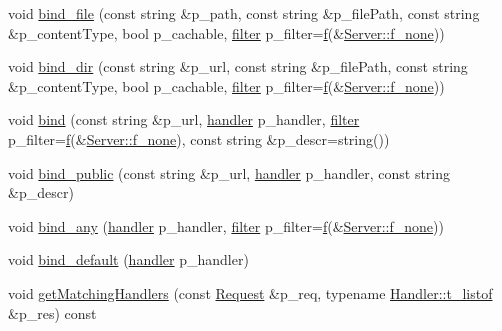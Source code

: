 \begin{DoxyCompactItemize}
\item 
void \hyperlink{classxtd_1_1network_1_1http_1_1Server_ad3788397b3bd576b156823267d377dcc}{bind\+\_\+file} (const string \&p\+\_\+path, const string \&p\+\_\+file\+Path, const string \&p\+\_\+content\+Type, bool p\+\_\+cachable, \hyperlink{structxtd_1_1network_1_1http_1_1Server_1_1Handler_1_1filter}{filter} p\+\_\+filter=\hyperlink{classxtd_1_1network_1_1http_1_1Server_a94d4867ec740265b62b7505584387240}{f}(\&\hyperlink{classxtd_1_1network_1_1http_1_1Server_a862d3098ef04ad7c503ab4e6d04a93cf}{Server\+::f\+\_\+none}))
\item 
void \hyperlink{classxtd_1_1network_1_1http_1_1Server_a58cb8102e486dd24780b876561ae6c11}{bind\+\_\+dir} (const string \&p\+\_\+url, const string \&p\+\_\+file\+Path, const string \&p\+\_\+content\+Type, bool p\+\_\+cachable, \hyperlink{structxtd_1_1network_1_1http_1_1Server_1_1Handler_1_1filter}{filter} p\+\_\+filter=\hyperlink{classxtd_1_1network_1_1http_1_1Server_a94d4867ec740265b62b7505584387240}{f}(\&\hyperlink{classxtd_1_1network_1_1http_1_1Server_a862d3098ef04ad7c503ab4e6d04a93cf}{Server\+::f\+\_\+none}))
\item 
void \hyperlink{classxtd_1_1network_1_1http_1_1Server_aa964ab0b0c3ba29238cb2aae49181537}{bind} (const string \&p\+\_\+url, \hyperlink{structxtd_1_1network_1_1http_1_1Server_1_1Handler_1_1handler}{handler} p\+\_\+handler, \hyperlink{structxtd_1_1network_1_1http_1_1Server_1_1Handler_1_1filter}{filter} p\+\_\+filter=\hyperlink{classxtd_1_1network_1_1http_1_1Server_a94d4867ec740265b62b7505584387240}{f}(\&\hyperlink{classxtd_1_1network_1_1http_1_1Server_a862d3098ef04ad7c503ab4e6d04a93cf}{Server\+::f\+\_\+none}), const string \&p\+\_\+descr=string())
\item 
void \hyperlink{classxtd_1_1network_1_1http_1_1Server_ac6876f1c054c6ebbe802381692fe05e2}{bind\+\_\+public} (const string \&p\+\_\+url, \hyperlink{structxtd_1_1network_1_1http_1_1Server_1_1Handler_1_1handler}{handler} p\+\_\+handler, const string \&p\+\_\+descr)
\item 
void \hyperlink{classxtd_1_1network_1_1http_1_1Server_a6e448be2d0ca71f808bec243cefc4000}{bind\+\_\+any} (\hyperlink{structxtd_1_1network_1_1http_1_1Server_1_1Handler_1_1handler}{handler} p\+\_\+handler, \hyperlink{structxtd_1_1network_1_1http_1_1Server_1_1Handler_1_1filter}{filter} p\+\_\+filter=\hyperlink{classxtd_1_1network_1_1http_1_1Server_a94d4867ec740265b62b7505584387240}{f}(\&\hyperlink{classxtd_1_1network_1_1http_1_1Server_a862d3098ef04ad7c503ab4e6d04a93cf}{Server\+::f\+\_\+none}))
\item 
void \hyperlink{classxtd_1_1network_1_1http_1_1Server_ab132be70e91c14a18638f93d28078b7b}{bind\+\_\+default} (\hyperlink{structxtd_1_1network_1_1http_1_1Server_1_1Handler_1_1handler}{handler} p\+\_\+handler)
\item 
void \hyperlink{classxtd_1_1network_1_1http_1_1Server_a302af1d5323a8c300f0de7acc27ffade}{get\+Matching\+Handlers} (const \hyperlink{classxtd_1_1network_1_1http_1_1Request}{Request} \&p\+\_\+req, typename \hyperlink{classxtd_1_1network_1_1http_1_1Server_1_1Handler_a840883d08fcdd990dbe33b660ee6febb}{Handler\+::t\+\_\+listof} \&p\+\_\+res) const 
\end{DoxyCompactItemize}
